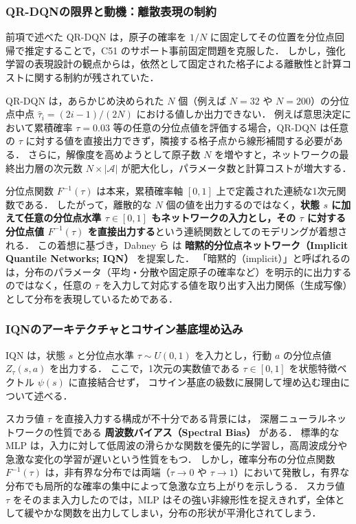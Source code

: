\documentclass[a4paper,10pt]{jsarticle}
\theoremstyle{definition}
\renewcommand{\Finv}{F^{-1}}
\begin{document}
\subsubsection{QR-DQNの限界と動機：離散表現の制約}
前項で述べた QR-DQN \cite{dabney2018qrdqn} は，原子の確率を $1/N$ に固定してその位置を分位点回帰で推定することで，C51 のサポート事前固定問題を克服した．
しかし，強化学習の表現設計の観点からは，依然として固定された格子による離散性と計算コストに関する制約が残されていた．

QR-DQN は，あらかじめ決められた $N$ 個（例えば $N=32$ や $N=200$）の分位点中点 $\hat\tau_i=(2i-1)/(2N)$ における値しか出力できない．
例えば意思決定において累積確率 $\tau=0.03$ 等の任意の分位点値を評価する場合，QR-DQN は任意の $\tau$ に対する値を直接出力できず，隣接する格子点から線形補間する必要がある．
さらに，解像度を高めようとして原子数 $N$ を増やすと，ネットワークの最終出力層の次元数 $N \times |\mathcal{A}|$ が肥大化し，パラメータ数と計算コストが増大する．

分位点関数 $\Finv(\tau)$ は本来，累積確率軸 $[0, 1]$ 上で定義された連続な1次元関数である．
したがって，離散的な $N$ 個の値を出力するのではなく，\textbf{状態 $s$ に加えて任意の分位点水準 $\tau \in [0, 1]$ もネットワークの入力とし，その $\tau$ に対する分位点値 $\Finv(\tau)$ を直接出力する}という連続関数としてのモデリングが着想される．
この着想に基づき，Dabney ら \cite{dabney2018iqn} は \textbf{暗黙的分位点ネットワーク（Implicit Quantile Networks; IQN）} を提案した．
「暗黙的（implicit）」と呼ばれるのは，分布のパラメータ（平均・分散や固定原子の確率など）を明示的に出力するのではなく，任意の $\tau$ を入力して対応する値を取り出す入出力関係（生成写像）として分布を表現しているためである．

\subsubsection{IQNのアーキテクチャとコサイン基底埋め込み}
IQN は，状態 $s$ と分位点水準 $\tau \sim U(0, 1)$ を入力とし，行動 $a$ の分位点値 $Z_\tau(s, a)$ を出力する．
ここで，1次元の実数値である $\tau \in [0, 1]$ を状態特徴ベクトル $\psi(s)$ に直接結合せず，
コサイン基底の級数に展開して埋め込む理由について述べる．

スカラ値 $\tau$ を直接入力する構成が不十分である背景には，
深層ニューラルネットワークの性質である \textbf{周波数バイアス（Spectral Bias）} \cite{rahaman2019spectral} がある．
標準的な MLP は，入力に対して低周波の滑らかな関数を優先的に学習し，高周波成分や急激な変化の学習が遅いという性質をもつ．
しかし，確率分布の分位点関数 $\Finv(\tau)$ は，非有界な分布では両端（$\tau \to 0$ や $\tau \to 1$）において発散し，有界な分布でも局所的な確率の集中によって急激な立ち上がりを示しうる．
スカラ値 $\tau$ をそのまま入力したのでは，MLP はその強い非線形性を捉えきれず，全体として緩やかな関数を出力してしまい，分布の形状が平滑化されてしまう．
\end{document}
